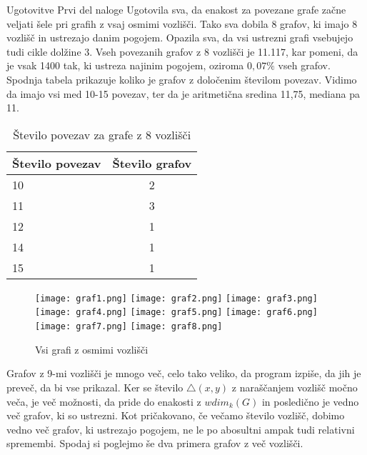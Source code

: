 \documentclass[12pt,a4paper]{amsart}
\makeatletter
\renewcommand\section{\@startsection{section}{1}%
  \z@{.5\linespacing\@plus.7\linespacing}{.5\linespacing}%
  {\normalfont\scshape\large\centering}}
\renewcommand\subsection{\@startsection{subsection}{2}%
  \z@{.5\linespacing\@plus.7\linespacing}{.5\linespacing}%
  {\normalfont\scshape}}
\theoremstyle{plain} %
\makeatother
\begin{document}
\section{Ugotovitve}
\subsection{Prvi del naloge}
Ugotovila sva, da enakost za povezane grafe začne veljati šele pri grafih z vsaj osmimi vozlišči.
Tako sva dobila 8 grafov, ki imajo 8 vozlišč in ustrezajo danim pogojem. Opazila sva, da vsi ustrezni grafi vsebujejo
tudi cikle dolžine 3. Vseh povezanih grafov z 8 vozlišči je 11.117, kar pomeni, da je vsak 1400 tak, 
ki ustreza najinim pogojem, oziroma $0,07\%$ vseh grafov. Spodnja tabela prikazuje koliko je grafov z določenim številom povezav. 
Vidimo da imajo vsi med 10-15 povezav, ter da je aritmetična sredina 11,75, mediana pa 11.

\begin{table}[h]
    \begin{center}
      \begin{tabular}{l|c} %
        \textbf{Število povezav} & \textbf{Število grafov} \\
        \hline
        10 & 2 \\
        11 & 3 \\
        12 & 1 \\
        14 & 1 \\
        15 & 1 \\
      \end{tabular}
    \end{center}
    \caption{Število povezav za grafe z 8 vozlišči}
    \label{tab:tabela1}
\end{table}

\bigskip
\begin{figure}[h]
    \centering
    \texttt{[image: graf1.png]}
    \texttt{[image: graf2.png]}
    \texttt{[image: graf3.png]}
    \texttt{[image: graf4.png]}
    \texttt{[image: graf5.png]}
    \texttt{[image: graf6.png]}
    \texttt{[image: graf7.png]}
    \texttt{[image: graf8.png]}
    \caption{Vsi grafi z osmimi vozlišči}
    \label{fig:slika1}
\end{figure}

Grafov z 9-mi vozlišči je mnogo več, celo tako veliko,
da program izpiše, da jih je preveč, da bi vse prikazal. Ker se število $\triangle(x,y)$ z naraščanjem vozlišč močno veča,
je več možnosti, da pride do enakosti z $wdim_k(G)$ in posledično je vedno več grafov, ki so ustrezni. Kot pričakovano, če 
večamo število vozlišč, dobimo vedno več grafov, ki ustrezajo pogojem, ne le po abosultni ampak tudi relativni spremembi.
Spodaj si poglejmo še dva primera grafov z več vozlišči. 
\bigskip
\end{document}
